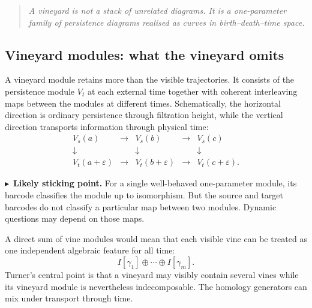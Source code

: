 \documentclass[11pt,a4paper]{article}
\newcommand{\planningbox}[2]{%
\subsection*{#1}
#2
}
\newcommand{\phrase}[1]{%
\begin{quote}
\emph{#1}
\end{quote}
}
\newcommand{\stickingpoint}[1]{%
\par\smallskip
\noindent\textcolor{red!65!black}{\(\blacktriangleright\)\ \textbf{Likely sticking point.}} #1
\par\smallskip
}
\begin{document}
\phrase{A vineyard is not a stack of unrelated diagrams. It is a one-parameter
family of persistence diagrams realised as curves in birth--death--time space.}

\planningbox{Vineyard modules: what the vineyard omits}{
A vineyard module retains more than the visible trajectories. It consists of
the persistence module \(V_t\) at each external time together with coherent
interleaving maps between the modules at different times. Schematically, the
horizontal direction is ordinary persistence through filtration height, while
the vertical direction transports information through physical time:
\[
\begin{array}{ccccc}
V_s(a)&\longrightarrow&V_s(b)&\longrightarrow&V_s(c)\\
\downarrow&&\downarrow&&\downarrow\\
V_t(a+\varepsilon)&\longrightarrow&
V_t(b+\varepsilon)&\longrightarrow&
V_t(c+\varepsilon).
\end{array}
\]

\stickingpoint{For a single well-behaved one-parameter module, its barcode
classifies the module up to isomorphism. But the source and target barcodes do
not classify a particular map between two modules. Dynamic questions may depend
on those maps.}

A direct sum of vine modules would mean that each visible vine can be treated as
one independent algebraic feature for all time:
\[
I[\gamma_1]\oplus\cdots\oplus I[\gamma_m].
\]
Turner's central point is that a vineyard may visibly contain several vines
while its vineyard module is nevertheless indecomposable. The homology
generators can mix under transport through time.
}
\end{document}
